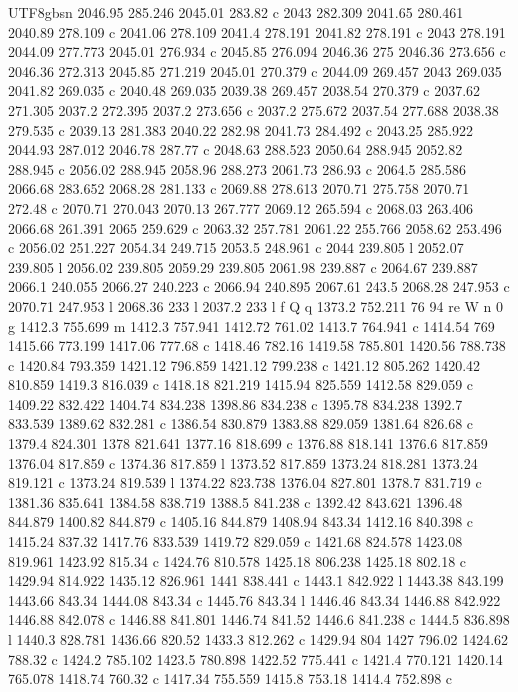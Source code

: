 \documentclass[11pt,a4paper,oneside]{report}
\begin{document}
\begin{CJK*}{UTF8}{gbsn}
{2046.95 285.246 2045.01 283.82 c 2043 282.309 2041.65 280.461 2040.89 278.109 c 2041.06 278.109 2041.4
278.191 2041.82 278.191 c 2043 278.191 2044.09 277.773 2045.01 276.934 c 2045.85 276.094 2046.36 275
2046.36 273.656 c 2046.36 272.313 2045.85 271.219 2045.01 270.379 c 2044.09 269.457 2043 269.035 2041.82
269.035 c 2040.48 269.035 2039.38 269.457 2038.54 270.379 c 2037.62 271.305 2037.2 272.395 2037.2 273.656
c 2037.2 275.672 2037.54 277.688 2038.38 279.535 c 2039.13 281.383 2040.22 282.98 2041.73 284.492 c
2043.25 285.922 2044.93 287.012 2046.78 287.77 c 2048.63 288.523 2050.64 288.945 2052.82 288.945 c
2056.02 288.945 2058.96 288.273 2061.73 286.93 c 2064.5 285.586 2066.68 283.652 2068.28 281.133 c 2069.88
278.613 2070.71 275.758 2070.71 272.48 c 2070.71 270.043 2070.13 267.777 2069.12 265.594 c 2068.03
263.406 2066.68 261.391 2065 259.629 c 2063.32 257.781 2061.22 255.766 2058.62 253.496 c 2056.02 251.227
2054.34 249.715 2053.5 248.961 c 2044 239.805 l 2052.07 239.805 l 2056.02 239.805 2059.29 239.805 2061.98
239.887 c 2064.67 239.887 2066.1 240.055 2066.27 240.223 c 2066.94 240.895 2067.61 243.5 2068.28 247.953
c 2070.71 247.953 l 2068.36 233 l 2037.2 233 l f Q q 1373.2 752.211 76 94 re W n 0 g 1412.3 755.699 m
1412.3 757.941 1412.72 761.02 1413.7 764.941 c 1414.54 769 1415.66 773.199 1417.06 777.68 c 1418.46
782.16 1419.58 785.801 1420.56 788.738 c 1420.84 793.359 1421.12 796.859 1421.12 799.238 c 1421.12
805.262 1420.42 810.859 1419.3 816.039 c 1418.18 821.219 1415.94 825.559 1412.58 829.059 c 1409.22
832.422 1404.74 834.238 1398.86 834.238 c 1395.78 834.238 1392.7 833.539 1389.62 832.281 c 1386.54
830.879 1383.88 829.059 1381.64 826.68 c 1379.4 824.301 1378 821.641 1377.16 818.699 c 1376.88 818.141
1376.6 817.859 1376.04 817.859 c 1374.36 817.859 l 1373.52 817.859 1373.24 818.281 1373.24 819.121 c
1373.24 819.539 l 1374.22 823.738 1376.04 827.801 1378.7 831.719 c 1381.36 835.641 1384.58 838.719 1388.5
841.238 c 1392.42 843.621 1396.48 844.879 1400.82 844.879 c 1405.16 844.879 1408.94 843.34 1412.16
840.398 c 1415.24 837.32 1417.76 833.539 1419.72 829.059 c 1421.68 824.578 1423.08 819.961 1423.92 815.34
c 1424.76 810.578 1425.18 806.238 1425.18 802.18 c 1429.94 814.922 1435.12 826.961 1441 838.441 c 1443.1
842.922 l 1443.38 843.199 1443.66 843.34 1444.08 843.34 c 1445.76 843.34 l 1446.46 843.34 1446.88 842.922
1446.88 842.078 c 1446.88 841.801 1446.74 841.52 1446.6 841.238 c 1444.5 836.898 l 1440.3 828.781 1436.66
820.52 1433.3 812.262 c 1429.94 804 1427 796.02 1424.62 788.32 c 1424.2 785.102 1423.5 780.898 1422.52
775.441 c 1421.4 770.121 1420.14 765.078 1418.74 760.32 c 1417.34 755.559 1415.8 753.18 1414.4 752.898 c
}
\end{CJK*}
\end{document}
